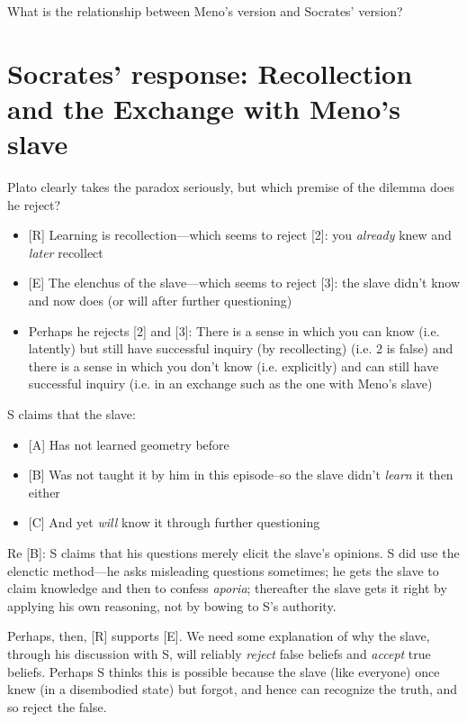 \documentclass[11pt]{article}
\begin{document}
\noindent What is the relationship between Meno's version and Socrates' version?

\section*{Socrates' response: Recollection and the Exchange with Meno's slave}

\noindent Plato clearly takes the paradox seriously, but which premise of the dilemma does he reject?
\vspace*{2mm}

\begin{itemize}\item{[R] Learning is recollection---which seems to reject [2]: you \emph{already} knew and \emph{later} recollect}\item{[E] The elenchus of the slave---which seems to reject [3]: the slave didn't know and now does (or will after further questioning)}\item{Perhaps he rejects [2] and [3]: There is a sense in which you can know (i.e. latently) but still have successful inquiry (by recollecting) (i.e. 2 is false) and there is a sense in which you don't know (i.e. explicitly) and can still have successful inquiry (i.e. in an exchange such as the one with Meno's slave)}\end{itemize}

\noindent S claims that the slave:
\begin{itemize}\item{[A] Has not learned geometry before}\item{[B] Was not taught it by him in this episode--so the slave didn't \emph{learn} it then either}\item{[C] And yet \emph{will} know it through further questioning}\end{itemize}

\noindent Re [B]: S claims that his questions merely elicit the slave's opinions. S did use the elenctic method---he asks misleading questions sometimes; he gets the slave to claim knowledge and then to confess \emph{aporia}; thereafter the slave gets it right by applying his own reasoning, not by bowing to S's authority.
\vspace*{2mm}

\noindent Perhaps, then, [R] supports [E]. We need some explanation of why the slave, through his discussion with S, will reliably \emph{reject} false beliefs and \emph{accept} true beliefs. Perhaps S thinks this is possible because the slave (like everyone) once knew (in a disembodied state) but forgot, and hence can recognize the truth, and so reject the false.
\vspace*{2mm}
\end{document}
